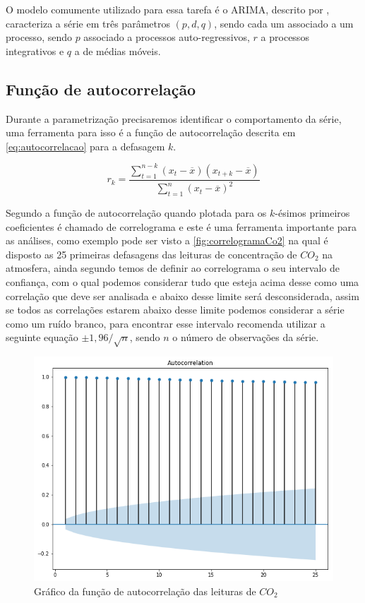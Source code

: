 \documentclass[
	12pt,
	oneside,
	a4paper,
	english,
	brazil
]{abntex2}
\begin{document}
O modelo comumente utilizado para essa tarefa é o ARIMA, descrito por 
, caracteriza a série em três parâmetros $(p,d,q)$, sendo cada 
um associado a um processo, sendo $p$ associado a processos auto-regressivos, 
$r$ a processos integrativos e $q$ a de médias móveis.

\subsection{Função de autocorrelação}\label{sec:corre}

Durante a parametrização precisaremos identificar o comportamento da série, uma 
ferramenta para isso é a função de autocorrelação descrita em 
\autoref{eq:autocorrelacao} para a defasagem $k$.

\begin{equation}
    \label{eq:autocorrelacao}
    r_k = \frac{\sum_{t=1}^{n-k}{(x_t - \overline{x})(x_{t+k} - 
    \overline{x})}}{\sum_{t=1}^{n}{(x_t - \overline{x})^2}}
\end{equation}

Segundo  a função de autocorrelação quando plotada para os 
$k$-ésimos primeiros coeficientes é chamado de correlograma e este é uma 
ferramenta importante para as análises, como exemplo pode ser visto a 
\autoref{fig:correlogramaCo2} na qual é disposto as 25 primeiras defasagens das 
leituras de concentração de $CO_2$ na atmosfera, ainda segundo 
 temos de definir ao correlograma o seu intervalo de 
confiança, com o qual podemos considerar tudo que esteja acima desse como uma 
correlação que deve ser analisada e abaixo desse limite será desconsiderada, 
assim se todos as correlações estarem abaixo desse limite podemos considerar a 
série como um ruído branco, para encontrar esse intervalo  
recomenda utilizar a seguinte equação $\pm{}1,96/\sqrt{n}$, sendo $n$ o número 
de observações da série.

\begin{figure}
    \centering
    \caption{Gráfico da função de autocorrelação das leituras de 
    $CO_2$}\label{fig:correlogramaCo2}
    \includegraphics[width=.6\linewidth]{images/acf_co2.png}
\end{figure}
\end{document}
